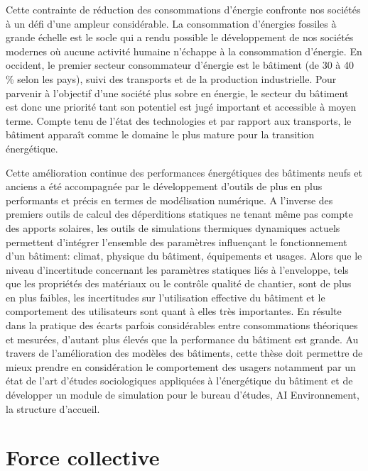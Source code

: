 Cette contrainte de réduction des consommations d'énergie confronte nos sociétés à un défi d'une ampleur considérable. La consommation d'énergies fossiles à grande échelle est le socle qui a rendu possible le développement de nos sociétés modernes où aucune activité humaine n'échappe à la consommation d'énergie. En occident, le premier secteur consommateur d'énergie est le bâtiment (de 30 à 40 \% selon les pays), suivi des transports et de la production industrielle. Pour parvenir à l'objectif d'une société plus sobre en énergie, le secteur du bâtiment est donc une priorité tant son potentiel est jugé important et accessible à moyen terme. Compte tenu de l'état des technologies et par rapport aux transports, le bâtiment apparaît comme le domaine le plus mature pour la transition énergétique.

Cette amélioration continue des performances énergétiques des bâtiments neufs et anciens a été accompagnée par le développement d'outils de plus en plus performants et précis en termes de modélisation numérique. A l'inverse des premiers outils de calcul des déperditions statiques ne tenant même pas compte des apports solaires, les outils de simulations thermiques dynamiques actuels permettent d'intégrer l'ensemble des paramètres influençant le fonctionnement d'un bâtiment: climat, physique du bâtiment, équipements et usages. Alors que le niveau d'incertitude concernant les paramètres statiques liés à l'enveloppe, tels que les propriétés des matériaux ou le contrôle qualité de chantier, sont de plus en plus faibles, les incertitudes sur l'utilisation effective du bâtiment et le comportement des utilisateurs sont quant à elles très importantes. En résulte dans la pratique des écarts parfois considérables entre consommations théoriques et mesurées, d'autant plus élevés que la performance du bâtiment est grande. Au travers de l'amélioration des modèles des bâtiments, cette thèse doit permettre de mieux prendre en considération le comportement des usagers notamment par un état de l'art d'études sociologiques appliquées à l'énergétique du bâtiment et de développer un module de simulation pour le bureau d'études, AI Environnement, la structure d'accueil.

\section*{Force collective}

